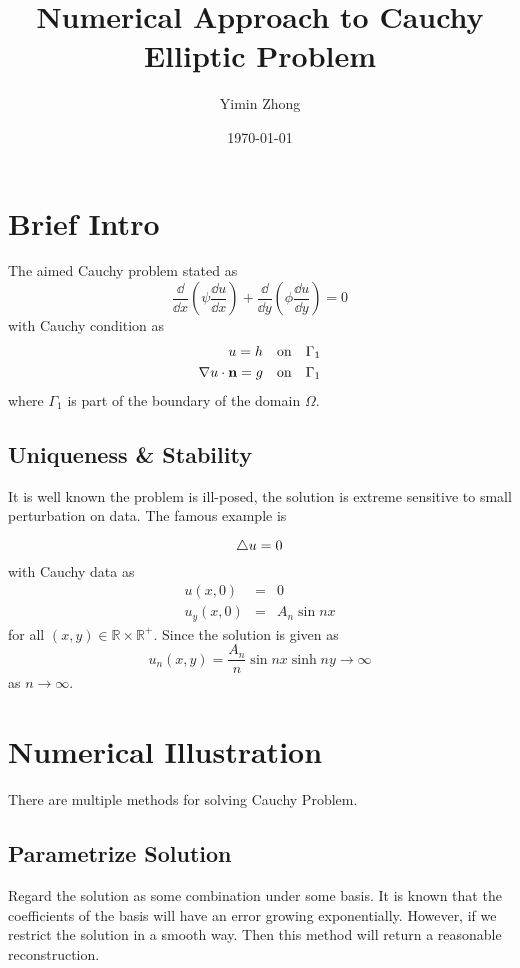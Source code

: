 \documentclass{note}
\author{Yimin Zhong}
\title{Numerical Approach to Cauchy Elliptic Problem}
\date{\today}
\begin{document}
\maketitle
\section{Brief Intro}
The aimed Cauchy problem stated as
\begin{equation}
\frac{\dd}{\dd x}\left(\psi \frac{\dd u}{\dd x}\right) + \frac{\dd}{\dd y}\left(\phi \frac{\dd u}{\dd y}\right) = 0
\end{equation}
with Cauchy condition as
\begin{eqnarray}
u  = h \quad\mbox{on}\quad \Gamma_1 \\
\nabla u \cdot \mathbf{n} = g \quad\mbox{on}\quad \Gamma_1
\end{eqnarray}
where $\Gamma_1$ is part of the boundary of the domain $\Omega$.
\subsection{Uniqueness \& Stability}
It is well known the problem is ill-posed, the solution is extreme sensitive to small perturbation on data. The famous example is
\begin{example}
\begin{equation}
\triangle u = 0
\end{equation}
with Cauchy data as
\begin{eqnarray}
u(x,0) &=& 0 \\
u_y(x,0) &=& A_n\sin nx 
\end{eqnarray}
for all $(x,y)\in \mathbb{R}\times\mathbb{R^{+}}$. Since the solution is given as
\begin{equation}
u_n(x,y) = \frac{A_n}{n}\sin nx \sinh ny \to\infty 
\end{equation}
as $n\to \infty$.
\end{example}

\section{Numerical Illustration}
There are multiple methods for solving Cauchy Problem.
\subsection{Parametrize Solution}
Regard the solution as some combination under some basis. It is known that the coefficients of the basis will have an error growing exponentially. However, if we restrict the solution in a smooth way. Then this method will return a reasonable reconstruction.
\end{document}
